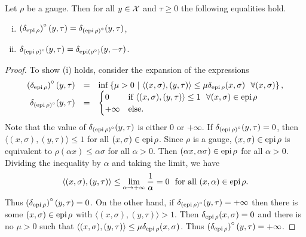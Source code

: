 \begin{prop}				\label{Prop:P-GD-indicator_epigraph_polar}
Let $\rho$ be a gauge.  Then for all $y \in {\mathcal X}$ and $\tau \geq 0$ the following equalities hold.
\begin{enumerate}[(i)]
\item
 $\left( \delta_{\textnormal{epi} \hspace{0.05cm} \rho} \right)^\circ(y, \tau) = \delta_{\left(  \textnormal{epi} \hspace{0.05cm} \rho \right)^\circ} (y, \tau)$,
\item
$\delta_{\left( \textnormal{epi} \hspace{0.05cm} \rho \right)^\circ} (y, \tau) = \delta_{\textnormal{epi} \left( \rho^\circ \right)}(y, -\tau)$.
\end{enumerate}
\end{prop}
\begin{proof}
To show (i) holds, consider the expansion of the expressions
\begin{equation*}
\begin{array}{rll}
\left( \delta_{\textnormal{epi} \halfspace \rho} \right)^\circ(y, \tau) 
	&	= 
			&	 \inf \left\{ \mu > 0 \ | \ \langle (x, \sigma), (y, \tau) \rangle \leq \mu \delta_{\epi \halfspace \rho}(x, \sigma) \ \ \forall (x, \sigma) \right\},
					\\
\delta_{\left( \epi \halfspace \rho \right)^\circ} (y, \tau) 
	&	= 
			&	\begin{cases}
						0 	&\textnormal{if } \langle (x, \sigma) , (y, \tau) \rangle \leq 1 \ \ \forall (x, \sigma) \in \epi \halfspace \rho \\
						+\infty	&\textnormal{else}.
				\end{cases}	
\end{array}
\end{equation*}
Note that the value of $\delta_{\left(  \textnormal{epi} \hspace{0.05cm} \rho \right)^\circ} (y, \tau)$ is either $0$ or $+\infty$.  If $\delta_{\left(  \textnormal{epi} \hspace{0.05cm} \rho \right)^\circ} (y, \tau) = 0$, then $\langle (x, \sigma), (y, \tau) \rangle  \leq 1$ for all $(x, \sigma) \in \textnormal{epi} \hspace{0.05cm} \rho$.  Since $\rho$ is a gauge, $(x, \sigma) \in \textnormal{epi} \hspace{0.05cm} \rho$ is equivalent to $\rho(\alpha x) \leq \alpha \sigma$ for all $\alpha > 0$.  Then $(\alpha x, \alpha \sigma) \in \textnormal{epi} \hspace{0.05cm} \rho$ for all $\alpha > 0$.  Dividing the inequality by $\alpha$ and taking the limit, we have
\begin{equation*}
\langle (x, \sigma), (y, \tau) \rangle \leq \lim\limits_{\substack{\alpha \rightarrow +\infty}} \frac{1}{\alpha} = 0 \ \ \textnormal{for all} \ (x, \alpha) \in \epi \halfspace \rho.
\end{equation*}
Thus $\left( \delta_{\textnormal{epi} \hspace{0.05cm} \rho} \right)^\circ(y, \tau)  = 0$.  On the other hand, if $\delta_{\left(  \textnormal{epi} \hspace{0.05cm} \rho \right)^\circ} (y, \tau) = +\infty$ then there is some $(x, \sigma) \in \textnormal{epi} \hspace{0.05cm} \rho$ with $\langle (x, \sigma) , (y, \tau) \rangle > 1$.  Then $\delta_{\textnormal{epi} \hspace{0.05cm} \rho}(x, \sigma) = 0$ and there is no $\mu >0$ such that $\langle (x, \sigma), (y, \tau) \rangle \leq \mu \delta_{\textnormal{epi} \hspace{0.05cm} \rho}(x, \sigma)$.  Thus $\left( \delta_{\textnormal{epi} \hspace{0.05cm} \rho} \right)^\circ(y, \tau)  = +\infty$.


\end{proof}
